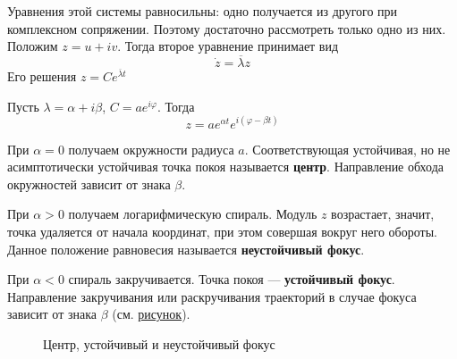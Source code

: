 Уравнения этой системы равносильны: одно получается из другого при комплексном сопряжении. Поэтому достаточно рассмотреть только одно из них. Положим $z = u + iv$. Тогда второе уравнение принимает вид
\begin{equation*}
    \dot{z} = \overline{\lambda}z
\end{equation*}
Его решения $z = Ce^{\overline{\lambda}t}$

Пусть $\lambda = \alpha + i\beta$, $C = ae^{i\varphi}$. Тогда
\begin{equation*}
    z = ae^{\alpha t}e^{i(\varphi - \beta t)}
\end{equation*}

При $\alpha = 0$ получаем окружности радиуса $a$. Соответствующая устойчивая, но не асимптотически устойчивая точка покоя называется \textbf{центр}. Направление обхода окружностей зависит от знака $\beta$.

При $\alpha > 0$ получаем логарифмическую спираль. Модуль $z$ возрастает, значит, точка удаляется от начала координат, при этом совершая вокруг него обороты. Данное положение равновесия называется \textbf{неустойчивый фокус}.

При $\alpha < 0$ спираль закручивается. Точка покоя --- \textbf{устойчивый фокус}. Направление закручивания или раскручивания траекторий в случае фокуса зависит от знака $\beta$ (см. \hyperref[focus]{рисунок}).

\begin{figure}[H]\label{focus}
    \caption{Центр, устойчивый и неустойчивый фокус}
\end{figure}
